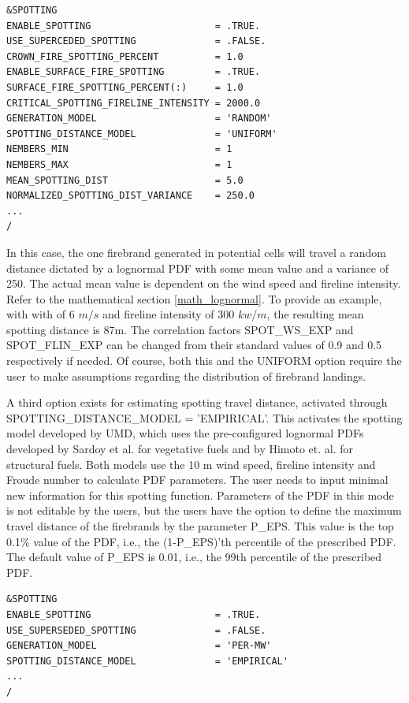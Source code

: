 \begin{verbatim}
&SPOTTING
ENABLE_SPOTTING                      = .TRUE.
USE_SUPERCEDED_SPOTTING              = .FALSE.
CROWN_FIRE_SPOTTING_PERCENT          = 1.0
ENABLE_SURFACE_FIRE_SPOTTING         = .TRUE.
SURFACE_FIRE_SPOTTING_PERCENT(:)     = 1.0
CRITICAL_SPOTTING_FIRELINE_INTENSITY = 2000.0
GENERATION_MODEL                     = 'RANDOM'
SPOTTING_DISTANCE_MODEL              = 'UNIFORM'
NEMBERS_MIN                          = 1
NEMBERS_MAX                          = 1
MEAN_SPOTTING_DIST                   = 5.0
NORMALIZED_SPOTTING_DIST_VARIANCE    = 250.0
...
/
\end{verbatim}

In this case, the one firebrand generated in potential cells will travel a random distance dictated by a lognormal PDF with some mean value and a variance of 250. The actual mean value is dependent on the wind speed and fireline intensity. Refer to the mathematical section \ref{math_lognormal}. To provide an example, with with of 6 $m/s$ and fireline intensity of 300 $kw/m$, the resulting mean spotting distance is 87m. The correlation factors SPOT\_WS\_EXP and SPOT\_FLIN\_EXP can be changed from their standard values of 0.9 and 0.5 respectively if needed. Of course, both this and the UNIFORM option require the user to make assumptions regarding the distribution of firebrand landings. 

A third option exists for estimating spotting travel distance, activated through SPOTTING\_DISTANCE\_MODEL = 'EMPIRICAL'. This activates the spotting model developed by UMD, which uses the pre-configured lognormal PDFs developed by Sardoy et al.\cite{sardoyNumericalStudyGroundlevel2008} for vegetative fuels and by Himoto et. al. \cite{himotoTransportDiskshapedFirebrands2005} for structural fuels. Both models use the 10 m wind speed, fireline intensity and Froude number to calculate PDF parameters. The user needs to input minimal new information for this spotting function. Parameters of the PDF in this mode is not editable by the users, but the users have the option to define the maximum travel distance of the firebrands by the parameter P\_EPS. This value is the top 0.1\% value of the PDF, i.e., the (1-P\_EPS)'th percentile of the prescribed PDF. The default value of P\_EPS is 0.01, i.e., the 99th percentile of the prescribed PDF. 

\begin{verbatim}
&SPOTTING
ENABLE_SPOTTING 					 = .TRUE.
USE_SUPERSEDED_SPOTTING 			 = .FALSE.
GENERATION_MODEL                     = 'PER-MW'
SPOTTING_DISTANCE_MODEL              = 'EMPIRICAL'
...
/
\end{verbatim}

